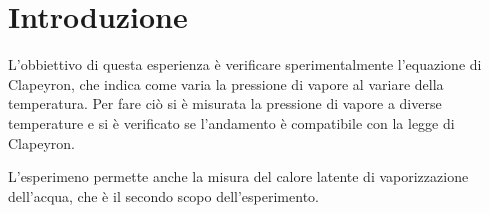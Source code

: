 \section{Introduzione}

L'obbiettivo di questa esperienza è verificare sperimentalmente l'equazione di Clapeyron, che indica
come varia la pressione di vapore al variare della temperatura. Per fare ciò si è misurata la pressione di vapore
a diverse temperature e si è verificato se l'andamento è compatibile con la legge di Clapeyron.

L'esperimeno permette anche la misura del calore latente di vaporizzazione dell'acqua, che è il secondo
scopo dell'esperimento.
